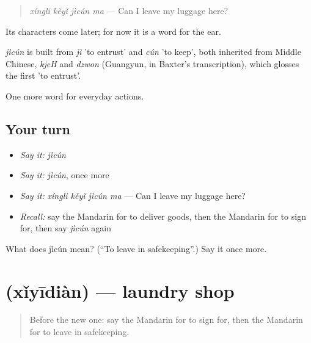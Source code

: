 \begin{quote}
\emph{xíngli kěyǐ jìcún ma} — Can I leave my luggage here?
\end{quote}

Its characters come later; for now it is a word for the ear.

\begin{cousinweb}
\emph{jìcún} is built from \emph{jì} 'to entrust' and \emph{cún} 'to keep', both inherited from Middle Chinese, \emph{kjeH} and \emph{dzwon} (Guangyun, in Baxter's transcription), which glosses the first 'to entrust'.
\end{cousinweb}

\begin{grammarlens}[title={What you've built}]
One more word for everyday actions.
\end{grammarlens}

\subsection*{Your turn}
\begin{itemize}
\raggedright
  \item \emph{Say it:} \emph{jìcún}
  \item \emph{Say it:} \emph{jìcún}, once more
  \item \emph{Say it:} \emph{xíngli kěyǐ jìcún ma} — Can I leave my luggage here?
  \item \emph{Recall:} say the Mandarin for to deliver goods, then the Mandarin for to sign for, then say \emph{jìcún} again
\end{itemize}

\begin{tcolorbox}[breakable,colback=teal!4,colframe=teal!35!black,title={Before you move on}]
What does jìcún mean? (\textquotedblleft{}To leave in safekeeping\textquotedblright{}.) Say it once more.
\end{tcolorbox}
\section[\texorpdfstring{\zh{洗衣店} (xǐyīdiàn)}{洗衣店 (xǐyīdiàn)}]{ (xǐyīdiàn) — laundry shop}

\label{lesson:ZH-C215-xiyidian}



\begin{quote}
Before the new one: say the Mandarin for to sign for, then the Mandarin for to leave in safekeeping.
\end{quote}


